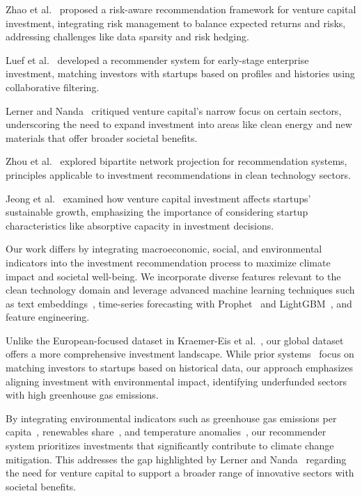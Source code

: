 \documentclass[sigconf]{acmart}
\begin{document}
Zhao et al.~\cite{ZhaoZhangWang2015} proposed a risk-aware recommendation framework for venture capital investment, integrating risk management to balance expected returns and risks, addressing challenges like data sparsity and risk hedging.

Luef et al.~\cite{LuefOhrfandlSacharidisWerthner2020} developed a recommender system for early-stage enterprise investment, matching investors with startups based on profiles and histories using collaborative filtering.

Lerner and Nanda~\cite{LernerNanda2020} critiqued venture capital's narrow focus on certain sectors, underscoring the need to expand investment into areas like clean energy and new materials that offer broader societal benefits.

Zhou et al.~\cite{ZhouRenMedoZhang2007} explored bipartite network projection for recommendation systems, principles applicable to investment recommendations in clean technology sectors.

Jeong et al.~\cite{JangLeeYoon2020} examined how venture capital investment affects startups' sustainable growth, emphasizing the importance of considering startup characteristics like absorptive capacity in investment decisions.

Our work differs by integrating macroeconomic, social, and environmental indicators into the investment recommendation process to maximize climate impact and societal well-being. We incorporate diverse features relevant to the clean technology domain and leverage advanced machine learning techniques such as text embeddings~\cite{reimers-2019-sentence-bert}, time-series forecasting with Prophet~\cite{taylor2018forecasting} and LightGBM~\cite{ke2017lightgbm}, and feature engineering.

Unlike the European-focused dataset in Kraemer-Eis et al.~\cite{KraemerEisBotsariLangPal2023}, our global dataset offers a more comprehensive investment landscape. While prior systems~\cite{ZhaoZhangWang2015,LuefOhrfandlSacharidisWerthner2020} focus on matching investors to startups based on historical data, our approach emphasizes aligning investment with environmental impact, identifying underfunded sectors with high greenhouse gas emissions.

By integrating environmental indicators such as greenhouse gas emissions per capita~\cite{OWIDTotalGHGPerCapita2024}, renewables share~\cite{OWIDRenewableEnergy2023}, and temperature anomalies~\cite{OWIDTempAnomaly2024}, our recommender system prioritizes investments that significantly contribute to climate change mitigation. This addresses the gap highlighted by Lerner and Nanda~\cite{LernerNanda2020} regarding the need for venture capital to support a broader range of innovative sectors with societal benefits.
\end{document}
